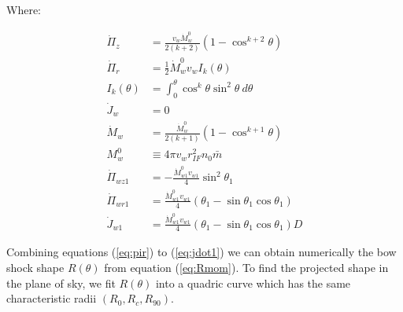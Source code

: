 Where:

\begin{align}
\dot{\Pi}_z &= \frac{v_w\dot{M}_w^0}{2(k+2)}\left(1-\cos^{k+2}\theta\right)  \label{eq:pir}\\
\dot{\Pi}_r &= \frac{1}{2}\dot{M}^0_w v_w I_k (\theta) \label{eq:piz}\\
I_k(\theta) & = \int^\theta_0 \cos^k \theta \sin^2\theta~d\theta \label{eq:Ik}\\
\dot{J}_w &= 0 \label{eq:jdot} \\
\dot{M}_w &= \frac{\dot{M}_w^0}{2(k+1)}\left(1-\cos^{k+1}\theta\right) \label{eq:dotprop} \\
M^0_w &\equiv 4\pi v_w r^2_{IF} n_0 \bar{m}\\
\dot{\Pi}_{wz1} & = -\frac{\dot{M}^0_{w1}v_{w1}}{4}\sin^2\theta_1\\
\dot{\Pi}_{wr1} & = \frac{\dot{M}^0_{w1}v_{w1}}{4}\left(\theta_1-\sin\theta_1\cos\theta_1\right)\\
\dot{J}_{w1} & = \frac{\dot{M}^0_{w1}v_{w1}}{4}\left(\theta_1-\sin\theta_1\cos\theta_1\right)D \label{eq:jdot1}
\end{align}

Combining equations  (\ref{eq:pir}) to (\ref{eq:jdot1}) we can obtain numerically the bow shock shape $R(\theta)$ from equation (\ref{eq:Rmom}).
To find the projected shape in the plane of sky, we fit $R(\theta)$ into a quadric curve which has the same characteristic radii $(R_0,R_c,R_{90})$. 

